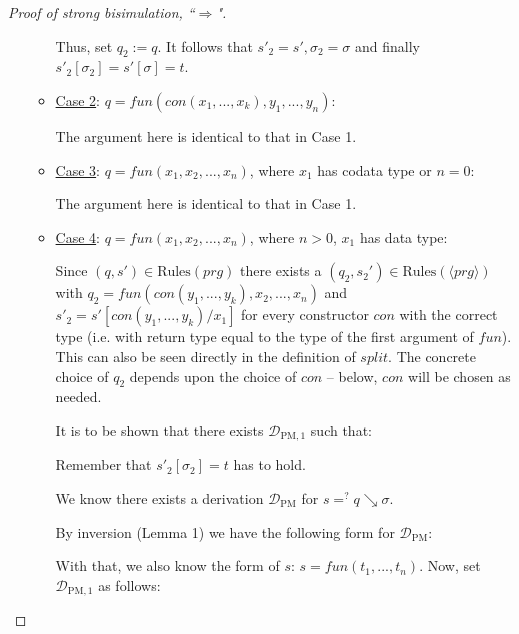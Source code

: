 \documentclass[11pt]{article} %
\begin{document}
\begin{proof}[Proof of strong bisimulation, ``$\Rightarrow$"]
\begin{enumerate}
\begin{itemize}
Thus, set $q_2 := q$. It follows that $s'_2 = s', \sigma_2 = \sigma$ and finally $s'_2[\sigma_2] = s'[\sigma] = t$.

\item \underline{Case 2}: $q = fun(con(x_1, ..., x_k), y_1, ..., y_n)$:

The argument here is identical to that in Case 1.

\item \underline{Case 3}: $q = fun(x_1, x_2, ..., x_n)$, where $x_1$ has codata type or $n = 0$:

The argument here is identical to that in Case 1.

\item \underline{Case 4}: $q = fun(x_1, x_2, ..., x_n)$, where $n > 0$, $x_1$ has data type:

Since $(q, s') \in \textrm{Rules}(prg)$ there exists a $(q_2, s_2') \in \textrm{Rules}(\langle prg \rangle)$ with $q_2 = fun(con(y_1, ..., y_k), x_2, ..., x_n)$ and $s'_2 = s'[con(y_1, ..., y_k) / x_1]$ for every constructor $con$ with the correct type (i.e. with return type equal to the type of the first argument of $fun$). This can also be seen directly in the definition of $split$. The concrete choice of $q_2$ depends upon the choice of $con$ -- below, $con$ will be chosen as needed.

It is to be shown that there exists $\mathcal{D}_{\textrm{PM}, 1}$ such that:

\begin{prooftree}
\end{prooftree}

Remember that $s'_2[\sigma_2] = t$ has to hold.

We know there exists a derivation $\mathcal{D}_{\textrm{PM}}$ for $s =^? q \searrow \sigma$.

By inversion (Lemma 1) we have the following form for $\mathcal{D}_{\textrm{PM}}$:

\begin{prooftree}
\end{prooftree}

With that, we also know the form of $s$: $s = fun(t_1, ..., t_n)$. Now, set $\mathcal{D}_{\textrm{PM}, 1}$ as follows:\\


\end{itemize}
\end{enumerate}
\end{proof}
\end{document}
